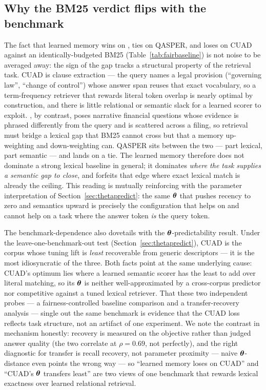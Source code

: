\subsection{Why the BM25 verdict flips with the benchmark}
\label{sec:whybm25}
The fact that learned memory wins on \FB{}, ties on QASPER, and loses on CUAD
against an identically-budgeted BM25 (Table~\ref{tab:fairbaseline}) is not noise
to be averaged away: the sign of the gap tracks a structural property of the
retrieval task. CUAD is clause extraction --- the query names a legal provision
(``governing law'', ``change of control'') whose answer span reuses that exact
vocabulary, so a term-frequency retriever that rewards literal token overlap is
nearly optimal by construction, and there is little relational or semantic slack
for a learned scorer to exploit. \FB{}, by contrast, poses narrative financial
questions whose evidence is phrased differently from the query and is scattered
across a filing, so retrieval must bridge a lexical gap that BM25 cannot cross
but that a memory up-weighting \wembed{} and down-weighting \wrec{} can. QASPER
sits between the two --- part lexical, part semantic --- and lands on a tie. The
learned memory therefore does not dominate a strong lexical baseline in general;
it dominates \emph{where the task supplies a semantic gap to close}, and forfeits
that edge where exact lexical match is already the ceiling. This reading is
mutually reinforcing with the parameter interpretation of
Section~\ref{sec:thetapredict}: the same $\boldsymbol{\theta}$ that pushes recency to zero
and semantics upward is precisely the configuration that helps on \FB{} and
cannot help on a task where the answer token \emph{is} the query token.

The benchmark-dependence also dovetails with the $\boldsymbol{\theta}$-predictability
result. Under the leave-one-benchmark-out test
(Section~\ref{sec:thetapredict}), CUAD is the corpus whose tuning lift is
\emph{least} recoverable from generic descriptors --- it is the most
idiosyncratic of the three. Both facts point at the same underlying cause:
CUAD's optimum lies where a learned semantic scorer has the least to add over
literal matching, so its $\boldsymbol{\theta}$ is neither well-approximated by a
cross-corpus predictor nor competitive against a tuned lexical retriever. That
these two independent probes --- a fairness-controlled baseline comparison and a
transfer-recovery analysis --- single out the same benchmark is evidence that the
CUAD loss reflects task structure, not an artifact of one experiment. We note the
contrast in mechanism honestly: recovery is measured on the \recallk{} objective
rather than judged answer quality (the two correlate at $\rho{=}0.69$, not
perfectly), and the right diagnostic for transfer is recall recovery, not
parameter proximity --- naive $\boldsymbol{\theta}$-distance even points the wrong way ---
so ``learned memory loses on CUAD'' and ``CUAD's $\boldsymbol{\theta}$ transfers least''
are two views of one benchmark that rewards lexical exactness over learned
relational retrieval.

